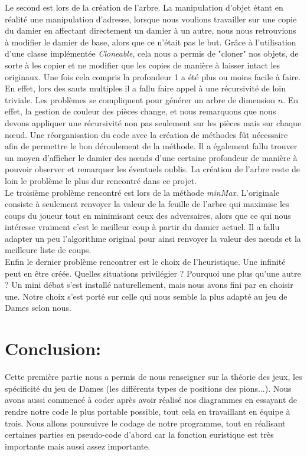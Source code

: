 \documentclass[12,french]{report}
\begin{document}
Le second est lors de la création de l'arbre. La manipulation d'objet étant en réalité une manipulation d'adresse, lorsque nous voulions travailler sur une copie du damier en affectant directement un damier à un autre, nous nous retrouvions à modifier le damier de base, alors que ce n'était pas le but. Grâce à l'utilisation d'une classe implémentée \textit{Cloneable}, cela nous a permis de "cloner" nos objets, de sorte à les copier et ne modifier que les copies de manière à laisser intact les originaux. Une fois cela compris la profondeur 1 a été plus ou moins facile à faire. En effet, lors des sauts multiples il a fallu faire appel à une récursivité de loin triviale. Les problèmes se compliquent pour générer un arbre de dimension $n$. En effet, la gestion de couleur des pièces change, et nous remarquons que nous devons appliquer une récursivité non pas seulement sur les pièces mais sur chaque nœud. Une réorganisation du code avec la création de méthodes fût nécessaire afin de permettre le bon déroulement de la méthode. Il a également fallu trouver un moyen d'afficher le damier des nœuds d'une certaine profondeur de manière à pouvoir observer et remarquer les éventuels oublis. La création de l'arbre reste de loin le problème le plus dur rencontré dans ce projet.\\

Le troisième problème rencontré est lors de la méthode \textit{minMax}. L'originale consiste à seulement renvoyer la valeur de la feuille de l'arbre qui maximise les coups du joueur tout en minimisant ceux des adversaires, alors que ce qui nous intéresse vraiment c'est le meilleur coup à partir du damier actuel. Il a fallu adapter un peu l'algorithme original pour ainsi renvoyer la valeur des nœuds et la meilleure liste de coups.\\

Enfin le dernier problème rencontrer est le choix de l'heuristique. Une infinité peut en être créée. Quelles situations privilégier ? Pourquoi une plus qu'une autre ? Un mini débat s'est installé naturellement, mais nous avons fini par en choisir une. Notre choix s'est porté sur celle qui nous semble la plus adapté au jeu de Dames selon nous.

\chapter*{Conclusion:}

Cette première partie nous a permis de nous renseigner sur la théorie
des jeux, les spécificité du jeu de Dames (les différents types de
positions des pions...). Nous avons aussi commencé à coder après avoir
réalisé nos diagrammes en essayant de rendre notre code le plus portable
possible, tout cela en travaillant en équipe à trois. Nous allons
poursuivre le codage de notre programme, tout en réalisant certaines
parties en pseudo-code d'abord car la fonction euristique est très
importante mais aussi assez importante.\\
\end{document}
